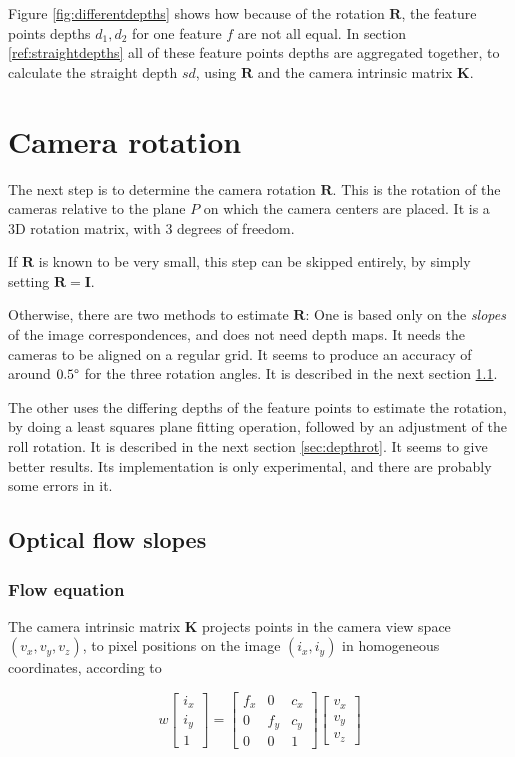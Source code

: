 \documentclass{scrreprt}
\newcommand{\matr}[1]{\mathbf{#1}}
\newcommand{\degr}{\text{\textdegree}}
\begin{document}
Figure \ref{fig:differentdepths} shows how because of the rotation $\matr{R}$, the feature points depths $d_1, d_2$ for one feature $f$ are not all equal. In section \ref{ref:straightdepths} all of these feature points depths are aggregated together, to calculate the straight depth $sd$, using $\matr{R}$ and the camera intrinsic matrix $\matr{K}$.



\section{Camera rotation}
\label{sec:camrotation}
The next step is to determine the camera rotation $\matr{R}$. This is the rotation of the cameras relative to the plane $P$ on which the camera centers are placed. It is a 3D rotation matrix, with 3 degrees of freedom.

If $\matr{R}$ is known to be very small, this step can be skipped entirely, by simply setting $\matr{R} = \matr{I}$.

Otherwise, there are two methods to estimate $\matr{R}$: One is based only on the \emph{slopes} of the image correspondences, and does not need depth maps. It needs the cameras to be aligned on a regular grid. It seems to produce an accuracy of around $0.5\degr$ for the three rotation angles. It is described in the next section \ref{sec:sloperot}.

The other uses the differing depths of the feature points to estimate the rotation, by doing a least squares plane fitting operation, followed by an adjustment of the roll rotation. It is described in the next section \ref{sec:depthrot}. It seems to give better results. Its implementation is only experimental, and there are probably some errors in it.


\subsection{Optical flow slopes}
\label{sec:sloperot}

\subsubsection{Flow equation}
The camera intrinsic matrix $\matr{K}$ projects points in the camera view space $(v_x, v_y, v_z)$, to pixel positions on the image $(i_x, i_y)$ in homogeneous coordinates, according to

\begin{equation}
w \begin{bmatrix}
	i_x \\ i_y \\ 1
\end{bmatrix}
= \begin{bmatrix}
	f_x & 0 & c_x \\
	0 & f_y & c_y \\
	0 & 0 & 1
\end{bmatrix}
\begin{bmatrix}
	v_x \\ v_y \\ v_z
\end{bmatrix}
\end{equation}
\end{document}
